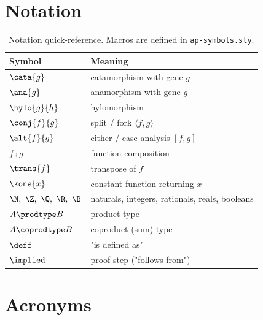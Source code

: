 \section*{Notation}

\begin{table}[h]
\centering
\begin{tabular}{ll}
\toprule
\textbf{Symbol} & \textbf{Meaning} \\
\midrule
$\cata{g}$              & catamorphism with gene $g$ \\
$\ana{g}$               & anamorphism with gene $g$ \\
$\hylo{g}{h}$           & hylomorphism \\
$\conj{f}{g}$           & split / fork $\langle f, g\rangle$ \\
$\alt{f}{g}$            & either / case analysis $[f, g]$ \\
$f \comp g$             & function composition \\
$\trans{f}$             & transpose of $f$ \\
$\kons{x}$              & constant function returning $x$ \\
$\N,\ \Z,\ \Q,\ \R,\ \B$ & naturals, integers, rationals, reals, booleans \\
$A \prodtype B$         & product type \\
$A \coprodtype B$       & coproduct (sum) type \\
$\deff$                 & "is defined as" \\
$\implied$              & proof step ("follows from") \\
\bottomrule
\end{tabular}
\caption{Notation quick-reference. Macros are defined in \texttt{ap-symbols.sty}.}
\label{tab:notation}
\end{table}

\section*{Acronyms}


